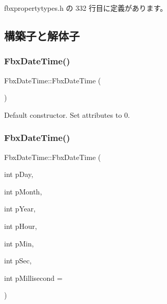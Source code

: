  fbxpropertytypes.\+h の 332 行目に定義があります。



\subsection{構築子と解体子}
\mbox{\label{class_fbx_date_time_a52200472ed4fb706c9c1e376e92732ce}} 
\subsubsection{\texorpdfstring{Fbx\+Date\+Time()}{FbxDateTime()}\hspace{0.1cm}{\footnotesize\ttfamily [1/2]}}
{\footnotesize\ttfamily Fbx\+Date\+Time\+::\+Fbx\+Date\+Time (\begin{DoxyParamCaption}{ }\end{DoxyParamCaption})}



Default constructor. Set attributes to 0. 

\mbox{\label{class_fbx_date_time_a78faa8aca65f60e3238cdbf2d1fa5034}} 
\subsubsection{\texorpdfstring{Fbx\+Date\+Time()}{FbxDateTime()}\hspace{0.1cm}{\footnotesize\ttfamily [2/2]}}
{\footnotesize\ttfamily Fbx\+Date\+Time\+::\+Fbx\+Date\+Time (\begin{DoxyParamCaption}\item[{int}]{p\+Day,  }\item[{int}]{p\+Month,  }\item[{int}]{p\+Year,  }\item[{int}]{p\+Hour,  }\item[{int}]{p\+Min,  }\item[{int}]{p\+Sec,  }\item[{int}]{p\+Millisecond = {} }\end{DoxyParamCaption})}

